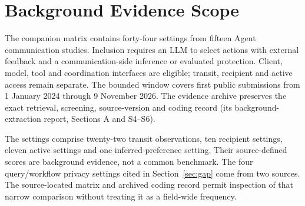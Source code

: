 \appendices
\section{Background Evidence Scope}\label{app:map}
The companion matrix contains forty-four settings from fifteen Agent communication studies. Inclusion requires an LLM to select actions with external feedback and a communication-side inference or evaluated protection. Client, model, tool and coordination interfaces are eligible; transit, recipient and active access remain separate. The bounded window covers first public submissions from 1 January 2024 through 9 November 2026. The evidence archive preserves the exact retrieval, screening, source-version and coding record (its background-extraction report, Sections A and S4--S6).

The settings comprise twenty-two transit observations, ten recipient settings, eleven active settings and one inferred-preference setting. Their source-defined scores are background evidence, not a common benchmark. The four query/workflow privacy settings cited in Section~\ref{sec:gap} come from two sources. The source-located matrix and archived coding record permit inspection of that narrow comparison without treating it as a field-wide frequency.

